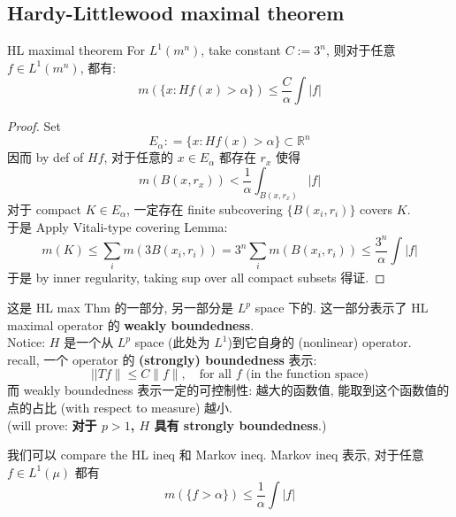 \documentclass[lang=cn,11pt]{elegantbook}
\begin{document}
\subsection{Hardy-Littlewood maximal theorem}
\begin{theorem}{HL maximal theorem}
For $L^1(m^n)$, take constant $C := 3^n$, 则对于任意 $f \in L^1(m^n)$, 都有: \[
m(\{x: Hf (x) > \alpha\}) \leq \frac{C}{\alpha} \int |f| 
\]
\end{theorem}
\begin{proof}
    Set \[
    E_\alpha : = \{x: Hf (x)> \alpha   \} \subset \mathbb{R}^n
    \]
    因而 by def of $Hf$, 对于任意的 $x \in E_\alpha$ 都存在 $r_x$ 使得 \[
    m(B(x,r_x))  < \frac{1}{\alpha} \int_{B(x,r_x)} |f|
    \]
对于 compact $K\in E_\alpha $, 一定存在 finite subcovering $\{B(x_i,r_i)\}$ covers $K$.\\
于是 Apply Vitali-type covering Lemma:\[
m(K) \leq \sum_i m(3B(x_i,r_i)) = 3^n \sum_i m(B(x_i,r_i)) \leq \frac{3^n}{\alpha} \int |f|
\]
于是 by inner regularity, taking sup over all compact subsets 得证.
\end{proof}
\begin{remark}
    这是 HL max Thm 的一部分, 另一部分是 $L^p$ space 下的.  这一部分表示了 HL maximal operator 的 \textbf{weakly boundedness}.\\
    Notice: $H$ 是一个从 $L^p$ space (此处为 $L^1$)到它自身的 (nonlinear) operator.\\
    recall, 一个 operator 的 \textbf{(strongly) boundedness} 表示: \[|| T f \|\leq C \| f \|, \quad \text{for all } f  \text{ (in the function space)}
\]
而 weakly boundedness 表示一定的可控制性: 越大的函数值, 能取到这个函数值的点的占比 (with respect to measure) 越小. \\
(will prove: \textbf{对于 $p>1$, $H$ 具有 strongly boundedness}.)
\end{remark}

\begin{remark}
    我们可以 compare the HL ineq 和 Markov ineq. Markov ineq 表示, 对于任意 $f \in L^1(\mu)$ 都有 \[
    m(\{f> \alpha\}) \leq \frac{1}{\alpha} \int |f|
    \]
\end{remark}
\end{document}
